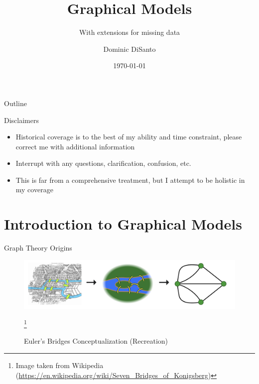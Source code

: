 \documentclass{beamer}
\title{Graphical Models}
\subtitle{With extensions for missing data}
\author{Dominic DiSanto}
\institute[]{Department of Biostatistics, Harvard University}
\date{\today}
\begin{document}
\maketitle


\begin{frame}{Outline}
\tableofcontents 
\end{frame}

\begin{frame}{Disclaimers}
    \begin{itemize}\setlength\itemsep{8mm}
        \item Historical coverage is to the best of my ability and time constraint, please correct me with additional information
        \item Interrupt with any questions, clarification, confusion, etc. 
        \item This is far from a comprehensive treatment, but I attempt to be holistic in my coverage 
    \end{itemize}
\end{frame}

\section{Introduction to Graphical Models}

\begin{frame}{Graph Theory Origins \cite{imperatorskaia_akademia_nauk_russia_commentarii_1726,shields_cultural_2012}}
\begin{figure}
    \centering 
    \includegraphics[scale=0.5]{Wikipedia_Bridges.png}
    \caption{Euler's Bridges Conceptualization (Recreation)}\footnote{Image taken from Wikipedia (\url{https://en.wikipedia.org/wiki/Seven_Bridges_of_Konigsberg})}
\end{figure}
\end{frame}
\end{document}
